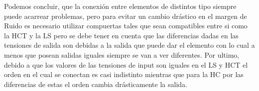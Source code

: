 Podemos concluir, que la conexión entre elementos de distintos tipo siempre puede acarrear problemas, pero para evitar un cambio drástico en el margen de Ruido es necesario utilizar compuertas tales que sean compatibles entre si como la HCT y la LS pero se debe tener en cuenta que las diferencias dadas en las tensiones de salida son debidas a la salida que puede dar el elemento con lo cual a menos que posean salidas iguales siempre se van a ver diferentes. Por ultimo, debido a que los valores de las tensiones de input son iguales en el LS y HCT el orden en el cual se conectan es casi indistinto mientras que para la HC por las diferencias de estas el orden cambia drásticamente la salida.\\
%